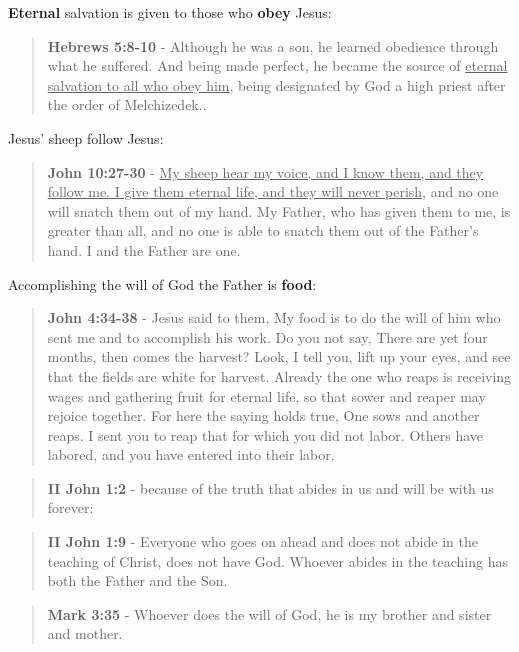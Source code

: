 \documentclass[11pt]{article}
\begin{document}
\textbf{Eternal} salvation is given to those who \textbf{obey} Jesus:

\begin{quote}
\textbf{Hebrews 5:8-10} - Although he was a son, he learned obedience through what he suffered. And being made perfect, he became the source of \uline{eternal salvation to all who obey him}, being designated by God a high priest after the order of Melchizedek..
\end{quote}

Jesus' sheep follow Jesus:

\begin{quote}
\textbf{John 10:27-30} - \uline{My sheep hear my voice, and I know them, and they follow me. I give them eternal life, and they will never perish,} and no one will snatch them out of my hand. My Father, who has given them to me, is greater than all, and no one is able to snatch them out of the Father's hand. I and the Father are one.
\end{quote}

Accomplishing the will of God the Father is \textbf{food}:

\begin{quote}
\textbf{John 4:34-38} - Jesus said to them, My food is to do the will of him who sent me and to accomplish his work. Do you not say, There are yet four months, then comes the harvest? Look, I tell you, lift up your eyes, and see that the fields are white for harvest. Already the one who reaps is receiving wages and gathering fruit for eternal life, so that sower and reaper may rejoice together. For here the saying holds true, One sows and another reaps. I sent you to reap that for which you did not labor. Others have labored, and you have entered into their labor.
\end{quote}

\begin{quote}
\textbf{II John 1:2} - because of the truth that abides in us and will be with us forever:
\end{quote}

\begin{quote}
\textbf{II John 1:9} - Everyone who goes on ahead and does not abide in the teaching of Christ, does not have God. Whoever abides in the teaching has both the Father and the Son.
\end{quote}

\begin{quote}
\textbf{Mark 3:35} - Whoever does the will of God, he is my brother and sister and mother.
\end{quote}
\end{document}
